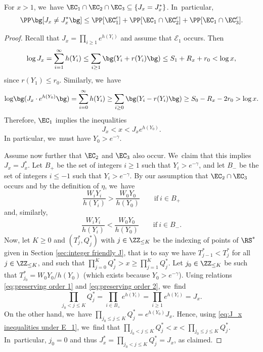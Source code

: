 \begin{lem}
\label{lem:decomposition J neq J*}
For $x > 1$, we~have $\EC_1\cap \EC_2\cap \EC_3\subseteq \{ J_x = J_x^*\}$. In~particular,
\[
\PP\bg[J_x \ne J_x^*\bg] \le \PP[\EC_1^c] + \PP[\EC_1 \cap \EC_2^c] + \PP[\EC_1 \cap \EC_3^c].
\]
\end{lem}

\begin{proof} Recall that $J_x=\prod_{i\ge1}e^{h(Y_i)}$ and assume that $\mathcal E_1$ occurs. Then
\begin{equation}
\label{eq:e1 implies J < x}
\log J_x = \sum_{i=1}^{\infty} h(Y_i) \le \sum_{i \ge 1} \bg(Y_i + r(Y_i)\bg) \le S_1 + R_x +r_0 < \log x,
\end{equation}
since $r(Y_1)\le r_0$. Similarly, we~have
\[
\log\!\bg(J_x\cdot e^{h(Y_0)}\bg) = \sum_{i=0}^{\infty} h(Y_i) \ge \sum_{i \ge 0} \bg(Y_i - r(Y_i)\bg) \ge S_0 - R_x -2r_0 > \log x.
\]
Therefore, $\EC_1$ implies the inequalities
\begin{equation}
\label{eq:J_x inequalities under E_1}
J_x < x < J_x e^{h(Y_0)}.
\end{equation}
In particular, we~must have $Y_0>e^{-\gamma}$.

Assume now further that $\EC_2$ and $\EC_3$ also occur. We~claim that this implies $J_x = J_x^*$. Let $B_+$ be the set of integers $i \ge 1$ such that $Y_i > e^{-\gamma}$, and let $B_-$ be the set of integers $i\le-1$ such that $Y_i>e^{-\gamma}$.
By our assumption that $\EC_2\cap\EC_3$ occurs and by the definition of $\eta$, we~have
\begin{equation}
\label{eq:preserving order 1}
\frac{W_iY_i}{h(Y_i)} > \frac{W_0Y_0}{h(Y_0)} \qquad\text{if}\ i\in B_+
\end{equation}
and, similarly,
\begin{equation}
\label{eq:preserving order 2}
\frac{W_iY_i}{h(Y_i)} < \frac{W_0Y_0}{h(Y_0)} \qquad\text{if}\ i\in B_-.
\end{equation}
Now, let $K \ge 0$ and $(T_j^*,Q_j^*)$ with $j\in\ZZ_{\le K}$ be the indexing of points of $\RS^*$ given in Section \ref{sec:integer friendly J}, that is to say we have $T_{j-1}^*<T_{j}^*$ for all $j \in \ZZ_{\le K}$, and such that $\prod_{j=0}^K Q_j^*>x \ge \prod_{j=1}^K Q_j^*$. Let $j_0\in\ZZ_{\le K}$ be such that $T_{j_0}^* = W_0Y_0/h(Y_0)$ (which exists because $Y_0>e^{-\gamma}$). Using relations \eqref{eq:preserving order 1} and \eqref{eq:preserving order 2}, we~find
\[
\prod_{j_0 < j \le K} Q_j^*=\prod_{i\in B_+} e^{h(Y_i)} = \prod_{i\ge1} e^{h(Y_i)} = J_x.
\]
On the other hand, we~have $\prod_{j_0 \le j \le K} Q_j^*=e^{h(Y_0)} J_x$. Hence, using \eqref{eq:J_x inequalities under E_1}, we~find that $\prod_{j_0 \!<\! j \!\le\! K}Q_j^*\!<\!x\!<\!\prod_{j_0 \le j \le K}Q_j^*$. In~particular, $j_0\!=\!0$ and thus $J_x^*=\prod_{j_0 < j \le K} Q_j^*\!=\!J_x$, as claimed.
\end{proof}

